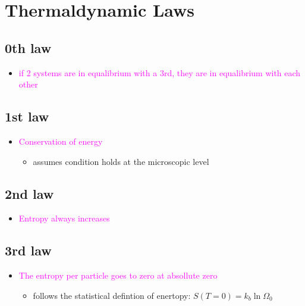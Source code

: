 

\section{Thermaldynamic Laws}

\subsection{0th law}
\begin{itemize}
    \item \textcolor{magenta}{if 2 systems are in equalibrium with a 3rd, they are in equalibrium 
    with each other} 
\end{itemize}


\subsection{1st law}
\begin{itemize}
    \item \textcolor{magenta}{Conservation of energy}
    \begin{itemize}
        \item assumes condition holds at the microscopic level
    \end{itemize}
\end{itemize}


\subsection{2nd law}
\begin{itemize}
    \item \textcolor{magenta}{Entropy always increases}
\end{itemize}


\subsection{3rd law}
\begin{itemize}
    \item \textcolor{magenta}{The entropy per particle goes to zero at absollute zero}
    \begin{itemize}
        \item follows the statistical defintion of enertopy: $S(T = 0) = k_b \ln \Omega_0$
    \end{itemize}
\end{itemize}
